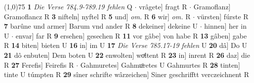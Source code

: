 \documentclass[8pt,a4paper,notitlepage]{article}
\begin{document}
\begin{table}[ht]
\begin{minipage}[t]{0.5\linewidth}
\line(1,0){75} \newline
\textbf{1} \textit{Die Verse 784.9-789.19 fehlen} Q   $\cdot$ vrâgete] fragt R  $\cdot$ Gramoflanz] Gramoflancz R \textbf{3} nifteln] nyftel R \textbf{5} und] \textit{om.} R \textbf{6} wir] \textit{om.} R  $\cdot$ vürsten] fúrste R \textbf{7} barûne und armer] Barum vnd ander R \textbf{8} dekeiner] dekeine U  $\cdot$ hinnen] her in U  $\cdot$ envar] far R \textbf{9} ersehen] gesechen R \textbf{11} vor gâbe] von habe R \textbf{13} gâben] gabe R \textbf{14} biten] bieten U \textbf{16} in] im U \textbf{17} \textit{Die Verse 785.17-19 fehlen} U  \textbf{20} dâ] Do U \textbf{21} dô enbuten] Dem boten U \textbf{22} enwolten] woͯltent R \textbf{23} in] inrent R \textbf{26} daz] die R \textbf{27} Ferefis] Feirefis R  $\cdot$ Gahmuretes] Gahmuͦretes U Gahmurtes R \textbf{28} tinten] tinte U túmpten R \textbf{29} sîner schrifte wârzeichen] Siner geschrifftt verczeichnent R \newline
\end{minipage}
\end{table}
\end{document}
